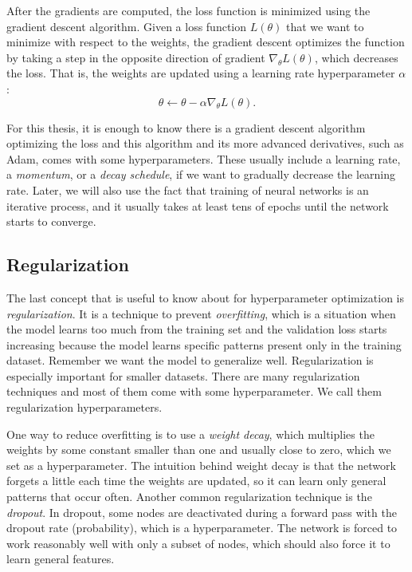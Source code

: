 After the gradients are computed, the loss function is minimized using the gradient descent algorithm. Given a loss function $L(\theta)$ that we want to minimize with respect to the weights, the gradient descent optimizes the function by taking a step in the opposite direction of gradient $\nabla_\theta L(\theta)$, which decreases the loss. That is, the weights are updated using a learning rate hyperparameter $\alpha$: $$ \theta \leftarrow \theta - \alpha \nabla_\theta L(\theta).$$

For this thesis, it is enough to know there is a gradient descent algorithm optimizing the loss and this algorithm and its more advanced derivatives, such as Adam, comes with some hyperparameters. These usually include a learning rate, a \textit{momentum}, or a \textit{decay schedule}, if we want to gradually decrease the learning rate. Later, we will also use the fact that training of neural networks is an iterative process, and it usually takes at least tens of epochs until the network starts to converge.

\subsection{Regularization}
The last concept that is useful to know about for hyperparameter optimization is \textit{regularization}. It is a technique to prevent \textit{overfitting}, which is a situation when the model learns too much from the training set and the validation loss starts increasing because the model learns specific patterns present only in the training dataset. Remember we want the model to generalize well. Regularization is especially important for smaller datasets. There are many regularization techniques and most of them come with some hyperparameter. We call them regularization hyperparameters.

One way to reduce overfitting is to use a \textit{weight decay}, which multiplies the weights by some constant smaller than one and usually close to zero, which we set as a hyperparameter. The intuition behind weight decay is that the network forgets a little each time the weights are updated, so it can learn only general patterns that occur often. Another common regularization technique is the \textit{dropout}. In dropout, some nodes are deactivated during a forward pass with the dropout rate (probability), which is a hyperparameter. The network is forced to work reasonably well with only a subset of nodes, which should also force it to learn general features.


